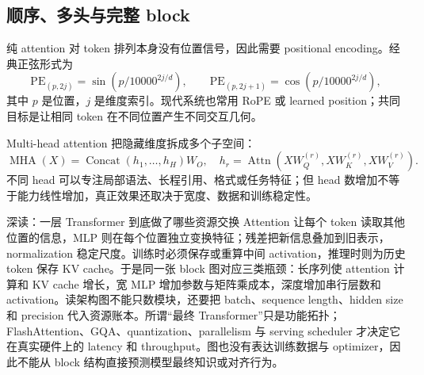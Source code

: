 
\subsection{顺序、多头与完整 block}

纯 attention 对 token 排列本身没有位置信号，因此需要 positional encoding。经典正弦形式为
\[
\mathrm{PE}_{(p,2j)}=\sin\!\left(p/10000^{2j/d}\right),\qquad
\mathrm{PE}_{(p,2j+1)}=\cos\!\left(p/10000^{2j/d}\right),
\]
其中 $p$ 是位置，$j$ 是维度索引。现代系统也常用 RoPE 或 learned position；共同目标是让相同 token 在不同位置产生不同交互几何。



Multi-head attention 把隐藏维度拆成多个子空间：
\[
\operatorname{MHA}(X)=\operatorname{Concat}(h_1,\ldots,h_H)W_O,
\quad h_r=\operatorname{Attn}(XW_Q^{(r)},XW_K^{(r)},XW_V^{(r)}).
\]
不同 head 可以专注局部语法、长程引用、格式或任务特征；但 head 数增加不等于能力线性增加，真正效果还取决于宽度、数据和训练稳定性。





\begin{knowledgebox}{深读：一层 Transformer 到底做了哪些资源交换}
Attention 让每个 token 读取其他位置的信息，MLP 则在每个位置独立变换特征；残差把新信息叠加到旧表示，normalization 稳定尺度。训练时必须保存或重算中间 activation，推理时则为历史 token 保存 KV cache。于是同一张 block 图对应三类瓶颈：长序列使 attention 计算和 KV cache 增长，宽 MLP 增加参数与矩阵乘成本，深度增加串行层数和 activation。读架构图不能只数模块，还要把 batch、sequence length、hidden size 和 precision 代入资源账本。所谓“最终 Transformer”只是功能拓扑；FlashAttention、GQA、quantization、parallelism 与 serving scheduler 才决定它在真实硬件上的 latency 和 throughput。图也没有表达训练数据与 optimizer，因此不能从 block 结构直接预测模型最终知识或对齐行为。
\end{knowledgebox}


